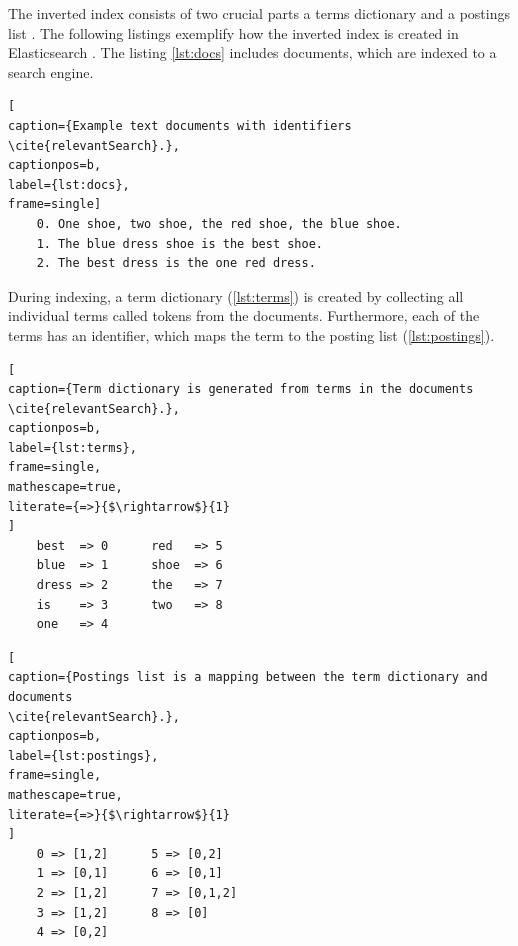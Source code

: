 The inverted index consists of two crucial parts a terms dictionary and a postings list \cite{relevantSearch}.
The following listings
exemplify how the inverted index is created in Elasticsearch \cite{relevantSearch}.
The listing \ref{lst:docs} includes documents, which are indexed to a search engine.
\begin{lstlisting}[
caption={Example text documents with identifiers \cite{relevantSearch}.},
captionpos=b,
label={lst:docs},
frame=single]
    0. One shoe, two shoe, the red shoe, the blue shoe.
    1. The blue dress shoe is the best shoe.
    2. The best dress is the one red dress.
\end{lstlisting}
During indexing, a term dictionary (\ref{lst:terms}) is created by collecting all individual
terms called tokens from the documents. 
Furthermore, each of the terms has an identifier, which maps the term to the posting list (\ref{lst:postings}).
\begin{lstlisting}[
caption={Term dictionary is generated from terms in the documents \cite{relevantSearch}.},
captionpos=b,
label={lst:terms},
frame=single,
mathescape=true,
literate={=>}{$\rightarrow$}{1}
]
    best  => 0      red   => 5
    blue  => 1      shoe  => 6
    dress => 2      the   => 7
    is    => 3      two   => 8
    one   => 4
\end{lstlisting}
\begin{lstlisting}[
caption={Postings list is a mapping between the term dictionary and documents
\cite{relevantSearch}.},
captionpos=b,
label={lst:postings},
frame=single,
mathescape=true,
literate={=>}{$\rightarrow$}{1}
]
    0 => [1,2]      5 => [0,2]
    1 => [0,1]      6 => [0,1]
    2 => [1,2]      7 => [0,1,2]
    3 => [1,2]      8 => [0]
    4 => [0,2]
\end{lstlisting}

